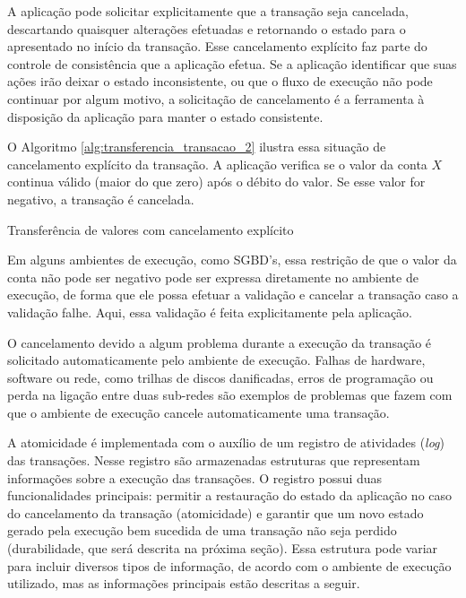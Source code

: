 \documentclass[11pt,twoside,a4paper]{book}
\begin{document}
A aplicação pode solicitar explicitamente que a transação seja cancelada, descartando quaisquer alterações efetuadas e retornando o estado para o apresentado no início da transação. Esse cancelamento explícito faz parte do controle de consistência que a aplicação efetua. Se a aplicação identificar que suas ações irão deixar o estado inconsistente, ou que o fluxo de execução não pode continuar por algum motivo, a solicitação de cancelamento é a ferramenta à disposição da aplicação para manter o estado consistente.

O Algoritmo \ref{alg:transferencia_transacao_2} ilustra essa situação de cancelamento explícito da transação. A aplicação verifica se o valor da conta $X$ continua válido (maior do que zero) após o débito do valor. Se esse valor for negativo, a transação é cancelada.

\begin{algorithm}
\caption{Transferência de valores com cancelamento explícito}
\label{alg:transferencia_transacao_2}
\end{algorithm}

Em alguns ambientes de execução, como SGBD's, essa restrição de que o valor da conta não pode ser negativo pode ser expressa diretamente no ambiente de execução, de forma que ele possa efetuar a validação e cancelar a transação caso a validação falhe. Aqui, essa validação é feita explicitamente pela aplicação.

O cancelamento devido a algum problema durante a execução da transação é solicitado automaticamente pelo ambiente de execução. Falhas de hardware, software ou rede, como trilhas de discos danificadas, erros de programação ou perda na ligação entre duas sub-redes são exemplos de problemas que fazem com que o ambiente de execução cancele automaticamente uma transação.

A atomicidade é implementada com o auxílio de um registro de atividades (\emph{log}) das transações. Nesse registro são armazenadas estruturas que representam informações sobre a execução das transações. O registro possui duas funcionalidades principais: permitir a restauração do estado da aplicação no caso do cancelamento da transação (atomicidade) e garantir que um novo estado gerado pela execução bem sucedida de uma transação não seja perdido (durabilidade, que será descrita na próxima seção). Essa estrutura pode variar para incluir diversos tipos de informação, de acordo com o ambiente de execução utilizado, mas as informações principais estão descritas a seguir.
\end{document}
